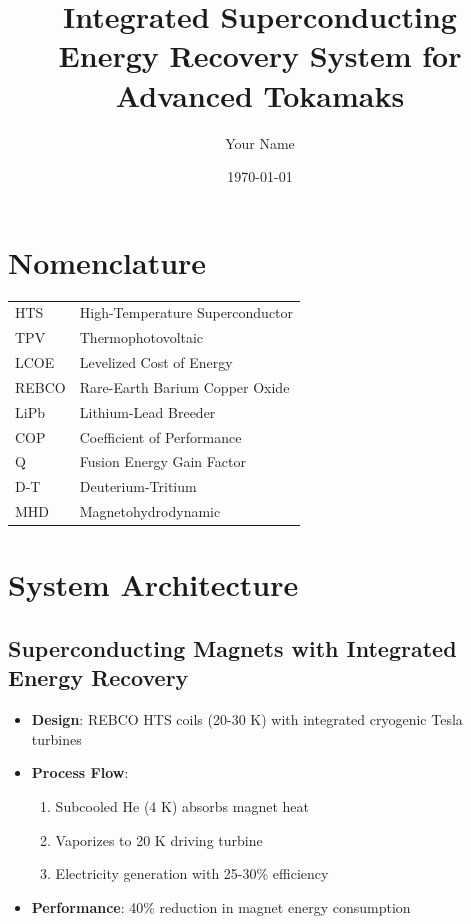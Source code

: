 \documentclass{article}
\title{Integrated Superconducting Energy Recovery System for Advanced Tokamaks}
\author{Your Name}
\date{\today}
\begin{document}
\maketitle

\section*{Nomenclature}
\begin{tabular}{ll}
HTS & High-Temperature Superconductor \\
TPV & Thermophotovoltaic \\
LCOE & Levelized Cost of Energy \\
REBCO & Rare-Earth Barium Copper Oxide \\
LiPb & Lithium-Lead Breeder \\
COP & Coefficient of Performance \\
Q & Fusion Energy Gain Factor \\
D-T & Deuterium-Tritium \\
MHD & Magnetohydrodynamic \\
\end{tabular}

\section{System Architecture}
\subsection{Superconducting Magnets with Integrated Energy Recovery}
\begin{itemize}
\item \textbf{Design}: REBCO HTS coils (20-30 K) with integrated cryogenic Tesla turbines
\item \textbf{Process Flow}:
\begin{enumerate}
\item Subcooled He (4 K) absorbs magnet heat
\item Vaporizes to 20 K driving turbine
\item Electricity generation with 25-30\% efficiency
\end{enumerate}
\item \textbf{Performance}: 40\% reduction in magnet energy consumption
\end{itemize}
\end{document}
